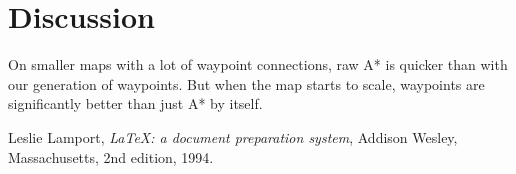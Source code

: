 \documentclass[a4paper]{article}
\begin{document}
\section{Discussion}
On smaller maps with a lot of waypoint connections, raw A* is quicker than with our generation of waypoints. But when the map starts to scale, waypoints are significantly better than just A* by itself.

\newpage
\begin{thebibliography}{9}

  Leslie Lamport,
  \textit{\LaTeX: a document preparation system},
  Addison Wesley, Massachusetts,
  2nd edition,
  1994.

\end{thebibliography}
\end{document}
